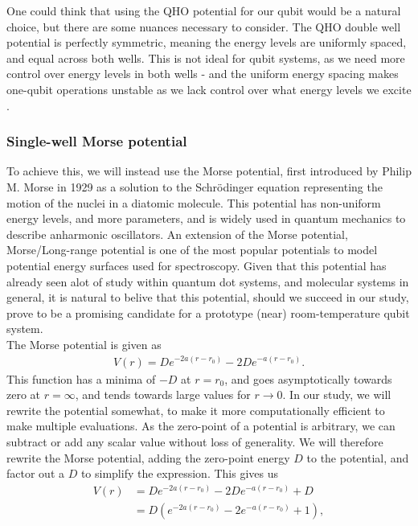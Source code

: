 \documentclass{subfiles}
\begin{document}
One could think that using the QHO potential for our qubit would be a natural choice, but there are some nuances necessary to consider. The QHO double well potential is perfectly symmetric, meaning the energy levels are uniformly spaced, and equal across both wells. This is not ideal for qubit systems, as we need more control over energy levels in both wells - and the uniform energy spacing makes one-qubit operations unstable as we lack control over what energy levels we excite \cite{devoret2013superconducting}. 

\subsubsection*{Single-well Morse potential}
To achieve this, we will instead use the Morse potential, first introduced by Philip M. Morse in 1929 as a solution to the Schrödinger equation representing the motion of the nuclei in a diatomic molecule\cite{morse1929diatomic}. This potential has non-uniform energy levels, and more parameters, and is widely used in quantum mechanics to describe anharmonic oscillators. An extension of the Morse potential, Morse/Long-range potential is one of the most popular potentials to model potential energy surfaces used for spectroscopy\cite{zhai2018constructing}. Given that this potential has already seen alot of study within quantum dot systems, and molecular systems in general, it is natural to belive that this potential, should we succeed in our study, prove to be a promising candidate for a prototype (near) room-temperature qubit system\cite{khordad2014linear, hayrapetyan2015exciton, sargsian2021effects}. \\
The Morse potential is given as
\begin{align*}
    V(r) = De^{-2a(r-r_0)} - 2De^{-a(r-r_0)}.
\end{align*}
This function has a minima of $-D$ at $r = r_0$, and goes asymptotically towards zero at $r=\infty$, and tends towards large values for $r\rightarrow0$. In our study, we will rewrite the potential somewhat, to make it more computationally efficient to make multiple evaluations. As the zero-point of a potential is arbitrary, we can subtract or add any scalar value without loss of generality. We will therefore rewrite the Morse potential, adding the zero-point energy $D$ to the potential, and factor out a $D$ to simplify the expression. This gives us
\begin{align*}
    V(r) &= De^{-2a(r-r_0)} - 2De^{-a(r-r_0)} + D \\
    &= D(e^{-2a(r-r_0)} - 2e^{-a(r-r_0)} + 1),
\end{align*}
\end{document}
